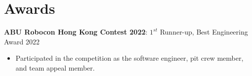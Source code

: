 \section{Awards}
\textbf{ABU Robocon Hong Kong Contest 2022}: $1^{st}$ Runner-up, Best Engineering Award \hfill 2022
\begin{itemize}
    \item Participated in the competition as the software engineer, pit crew member, and team appeal member.
\end{itemize}

